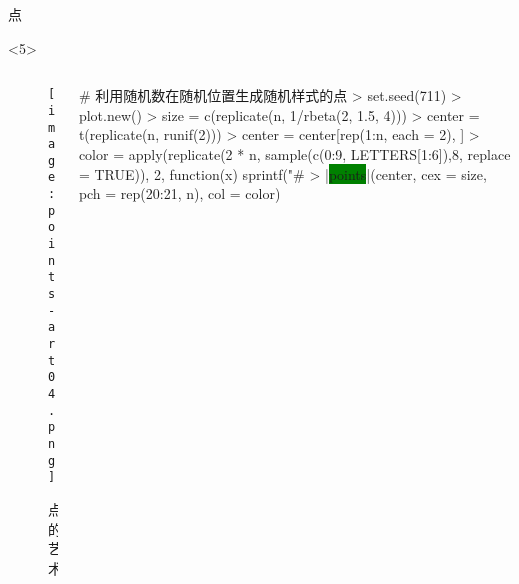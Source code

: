 \begin{frame}[t,fragile]{\subsecname}{点}
\begin{overlayarea}{\textwidth}{\textheight}
\begin{onlyenv}<5>
  \begin{columns}
    \begin{column}{.4\textwidth}
\centering
\begin{figure}
    \texttt{[image: points-art04.png]}
    \caption{点的艺术}
\end{figure}
    \end{column}

    \begin{column}{.6\textwidth}
\begin{rcode}
# 利用随机数在随机位置生成随机样式的点
> set.seed(711)
> plot.new()
> size = c(replicate(n, 1/rbeta(2, 1.5, 4)))
> center = t(replicate(n, runif(2)))
> center = center[rep(1:n, each = 2), ]
> color = apply(replicate(2 * n, sample(c(0:9, LETTERS[1:6]),8, replace = TRUE)),
              2, function(x) sprintf("#%
> |\colorbox{green}{points}|(center, cex = size, pch = rep(20:21, n), col = color)
\end{rcode}
    \end{column}
  \end{columns}
\end{onlyenv}
\end{overlayarea}  
\end{frame}

